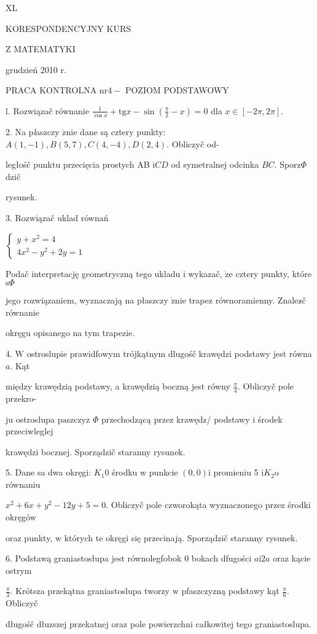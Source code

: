 \documentclass[a4paper,12pt]{article}
\begin{document}
XL

KORESPONDENCYJNY KURS

Z MATEMATYKI

grudzień 2010 r.

PRACA KONTROLNA $\mathrm{n}\mathrm{r} 4-$ POZIOM PODSTAWOWY

l. Rozwiązač równanie $\displaystyle \frac{1}{\cos x}+\mathrm{t}\mathrm{g}x-\sin(\frac{\pi}{2}-x)=0$ dla $x\in[-2\pi,2\pi].$

2. Na p{\it l}aszczy $\acute{\mathrm{z}}\mathrm{n}\mathrm{i}\mathrm{e}$ dane są cztery punkty: $A(1,-1), B(5,7), C(4,-4), D(2,4)$. Obliczyč od-

ległośč punktu przecięcia prostych AB $\mathrm{i}CD$ od symetralnej odcinka $BC$. Sporz$\Phi$dzič

rysunek.

3. Rozwiązač uklad równań

$\left\{\begin{array}{l}
y+x^{2}=4\\
4x^{2}-y^{2}+2y=1
\end{array}\right.$

Podač interpretację geometryczną tego ukladu $\mathrm{i}$ wykazač, $\dot{\mathrm{z}}\mathrm{e}$ cztery punkty, które $\mathrm{s}\Phi$

jego rozwiązaniem, wyznaczają na płaszczy $\acute{\mathrm{z}}\mathrm{n}\mathrm{i}\mathrm{e}$ trapez równoramienny. Znalez$\acute{}$č równanie

okręgu opisanego na tym trapezie.

4. $\mathrm{W}$ ostroslupie prawidfowym trójkątnym dlugośč krawędzi podstawy jest równa $a$. Kąt

między krawędzią podstawy, a krawędzią boczną jest równy $\displaystyle \frac{\pi}{4}$. Obliczyč pole przekro-

ju ostrosłupa $\mathrm{p}\mathrm{a}$szczyz $\Phi$ przechodzącą przez krawędz/ podstawy $\mathrm{i}$ środek przeciwleglej

krawędzi bocznej. Sporządzič staranny rysunek.

5. Dane sa dwa okręgi: $K_{1}0$ środku $\mathrm{w}$ punkcie $(0,0)\mathrm{i}$ promieniu 5 $\mathrm{i}K_{2}\mathrm{o}$ równaniu

$x^{2}+6x+y^{2}-12y+5=0$. Obliczyč pole czworokąta wyznaczonego przez środki okręgów

oraz punkty, $\mathrm{w}$ których te okręgi się przecinają. Sporządzič staranny rysunek.

6. Podstawą graniastosłupa jest równolegfobok $0$ bokach dfugości $a\mathrm{i}2a$ oraz kącie ostrym

$\displaystyle \frac{\pi}{3}$. Krótsza przekątna graniastoslupa tworzy $\mathrm{w}$ pfaszczyzną podstawy kąt $\displaystyle \frac{\pi}{6}$. Obliczyč

długośč dłuzszej przekatnej oraz pole powierzchni całkowitej tego graniastoslupa.
\end{document}
